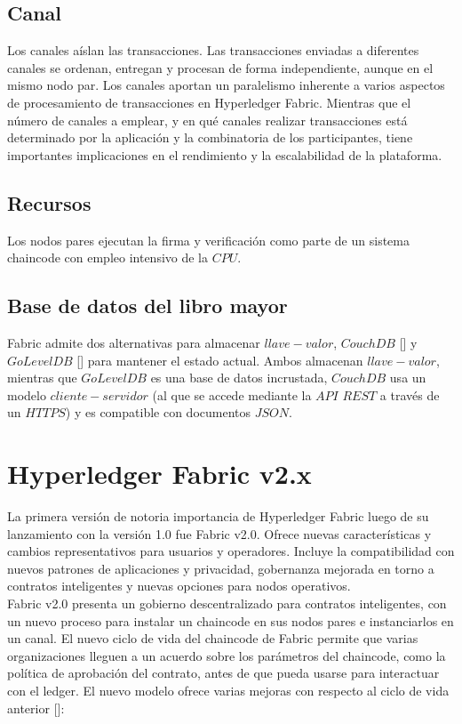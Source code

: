 \subsection{Canal}
Los canales a\'islan las transacciones. Las transacciones enviadas a diferentes canales se ordenan, entregan y procesan de forma independiente, aunque en el mismo nodo par. Los canales aportan un paralelismo inherente a varios aspectos de procesamiento de transacciones en Hyperledger Fabric. Mientras que el n\'umero de canales a emplear, y en qu\'e canales realizar transacciones est\'a determinado por la aplicaci\'on y la combinatoria de los participantes, tiene importantes implicaciones en el rendimiento y la escalabilidad de la plataforma.

\subsection{Recursos}
Los nodos pares ejecutan la firma y verificaci\'on como parte de un sistema chaincode con empleo intensivo de la $CPU$.

\subsection{Base de datos del libro mayor}
Fabric admite dos alternativas para almacenar $llave-valor$, $CouchDB$ [\cite{CouchDB}] y $GoLevelDB$ [\cite{GoLevelDB}] para mantener el estado actual. Ambos almacenan $llave-valor$, mientras que $GoLevelDB$ es una base de datos incrustada, $CouchDB$ usa un modelo $cliente-servidor$ (al que se accede mediante la $API$ $REST$ a trav\'es de un $HTTPS$) y es compatible con documentos $JSON$.

\section{Hyperledger Fabric v2.x}
La primera versi\'on de notoria importancia de Hyperledger Fabric luego de su lanzamiento con la versi\'on 1.0 fue Fabric v2.0. Ofrece nuevas caracter\'isticas y cambios representativos para usuarios y operadores. Incluye la compatibilidad con nuevos patrones de aplicaciones y privacidad, gobernanza mejorada en torno a contratos inteligentes y nuevas opciones para nodos operativos.\\

Fabric v2.0 presenta un gobierno descentralizado para contratos inteligentes, con un nuevo proceso para instalar un chaincode en sus nodos pares e instanciarlos en un canal. El nuevo ciclo de vida del chaincode de Fabric permite que varias organizaciones lleguen a un acuerdo sobre los par\'ametros del chaincode, como la pol\'itica de aprobaci\'on del contrato, antes de que pueda usarse para interactuar con el ledger. El nuevo modelo ofrece varias mejoras con respecto al ciclo de vida anterior [\cite{hyperledger2018hyperledger}]:

